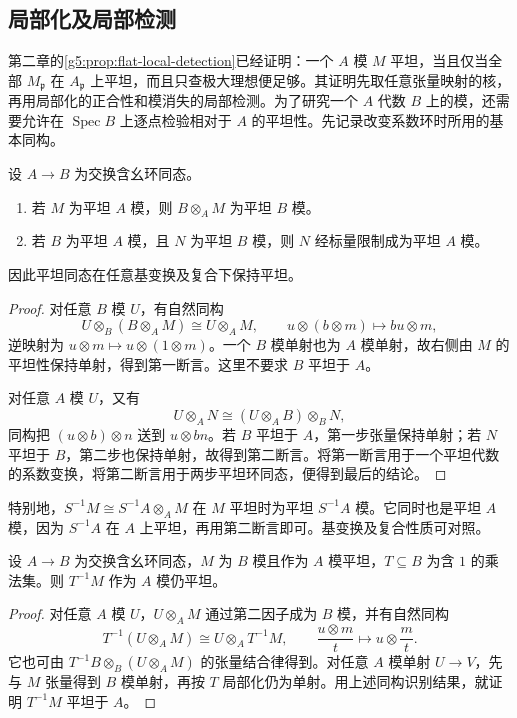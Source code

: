 \subsection{局部化及局部检测}
\label{g5:subsec:0601:04}

第二章的\cref{g5:prop:flat-local-detection}已经证明：一个 \(A\) 模 \(M\) 平坦，当且仅当全部 \(M_{\mathfrak p}\) 在 \(A_{\mathfrak p}\) 上平坦，而且只查极大理想便足够。其证明先取任意张量映射的核，再用局部化的正合性和模消失的局部检测。为了研究一个 \(A\) 代数 \(B\) 上的模，还需要允许在 \(\operatorname{Spec}B\) 上逐点检验相对于 \(A\) 的平坦性。先记录改变系数环时所用的基本同构。

\begin{proposition}\label{g5:prop:flat-base-change}
	设 \(A\to B\) 为交换含幺环同态。
	\begin{enumerate}
		\item 若 \(M\) 为平坦 \(A\) 模，则 \(B\otimes_A M\) 为平坦 \(B\) 模。
		\item 若 \(B\) 为平坦 \(A\) 模，且 \(N\) 为平坦 \(B\) 模，则 \(N\) 经标量限制成为平坦 \(A\) 模。
	\end{enumerate}
	因此平坦同态在任意基变换及复合下保持平坦。
\end{proposition}
\begin{proof}
	对任意 \(B\) 模 \(U\)，有自然同构
	\[
		U\otimes_B(B\otimes_A M)\cong U\otimes_A M,\qquad
		u\otimes(b\otimes m)\longmapsto bu\otimes m,
	\]
	逆映射为 \(u\otimes m\mapsto u\otimes(1\otimes m)\)。一个 \(B\) 模单射也为 \(A\) 模单射，故右侧由 \(M\) 的平坦性保持单射，得到第一断言。这里不要求 \(B\) 平坦于 \(A\)。

	对任意 \(A\) 模 \(U\)，又有
	\[
		U\otimes_A N\cong(U\otimes_A B)\otimes_B N,
	\]
	同构把 \((u\otimes b)\otimes n\) 送到 \(u\otimes bn\)。若 \(B\) 平坦于 \(A\)，第一步张量保持单射；若 \(N\) 平坦于 \(B\)，第二步也保持单射，故得到第二断言。将第一断言用于一个平坦代数的系数变换，将第二断言用于两步平坦环同态，便得到最后的结论。
\end{proof}

特别地，\(S^{-1}M\cong S^{-1}A\otimes_A M\) 在 \(M\) 平坦时为平坦 \(S^{-1}A\) 模。它同时也是平坦 \(A\) 模，因为 \(S^{-1}A\) 在 \(A\) 上平坦，再用第二断言即可。基变换及复合性质可对照\cite[第7节，第46页]{Matsumura1989}。

\begin{proposition}\label{g5:prop:relative-flat-localization}
	设 \(A\to B\) 为交换含幺环同态，\(M\) 为 \(B\) 模且作为 \(A\) 模平坦，\(T\subseteq B\) 为含 \(1\) 的乘法集。则 \(T^{-1}M\) 作为 \(A\) 模仍平坦。
\end{proposition}
\begin{proof}
	对任意 \(A\) 模 \(U\)，\(U\otimes_A M\) 通过第二因子成为 \(B\) 模，并有自然同构
	\[
		T^{-1}(U\otimes_A M)\cong U\otimes_A T^{-1}M,\qquad
		\frac{u\otimes m}{t}\longmapsto u\otimes\frac mt.
	\]
	它也可由
	\(T^{-1}B\otimes_B(U\otimes_A M)\) 的张量结合律得到。对任意 \(A\) 模单射 \(U\to V\)，先与 \(M\) 张量得到 \(B\) 模单射，再按 \(T\) 局部化仍为单射。用上述同构识别结果，就证明 \(T^{-1}M\) 平坦于 \(A\)。
\end{proof}

